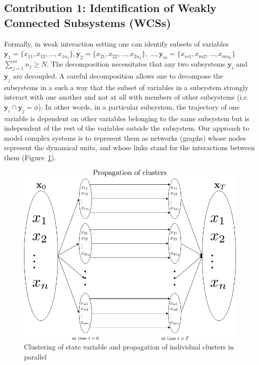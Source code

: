 \subsection{Contribution 1: Identification of Weakly Connected Subsystems (WCSs)}
Formally, in weak interaction setting one can identify subsets of variables  $\mathbf{y}_1 = \lbrace x_{11},x_{12},\ldots,x_{1n_1} \rbrace,  \mathbf{y}_2 = \lbrace x_{21},x_{22},\ldots,x_{2n_2} \rbrace,  \  \hdots,  \mathbf{y}_m = \lbrace x_{m1},x_{m2},\ldots,x_{mn_k} \rbrace$ $\sum_{j=1}^m n_j \geq N$. The decomposition necessitates  that any two subsystems $\mathbf{y}_i$ and  $\mathbf{y}_j$  are decoupled. A careful decomposition allows one to decompose the subsystems in a such a way that the subset of variables in a subsystem strongly interact with one another and not at all with members of other subsystems (i.e. $\mathbf{y}_i \cap \mathbf{y}_j = \phi$). In other words, in a particular subsystem, the trajectory of one variable is dependent on other variables belonging to the same subsystem but is independent of the rest of the variables outside the subsystem. Our approach to model complex systems is to represent them as networks (graphs) whose nodes represent the dynamical units, and whose links stand for the interactions between them (Figure~\ref{fig:clusters}).

\begin{figure}[H]
\centering
\includegraphics[scale=0.5]{figures_2/clusters}
\caption{Clustering of state variable and propagation of individual clusters in parallel}
\label{fig:clusters}
\end{figure}

